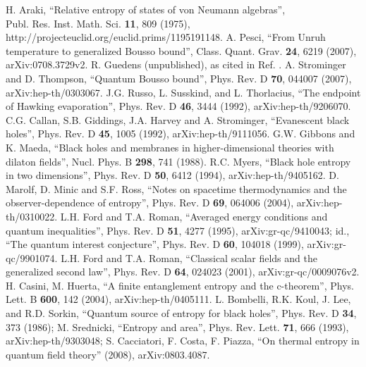 \documentclass{article}
\begin{document}
\begin{thebibliography}{99}
H. Araki, ``Relative entropy of states of von Neumann algebras'', \\Publ. Res. Inst. Math. Sci. \textbf{11}, 809 (1975), \\http://projecteuclid.org/euclid.prims/1195191148.
A. Pesci, ``From Unruh temperature to generalized Bousso bound'', Class. Quant. Grav. \textbf{24}, 6219 (2007), arXiv:0708.3729v2.
R. Guedens (unpublished), as cited in Ref. \cite{BFM03}.
A. Strominger and D. Thompson, ``Quantum Bousso bound'', Phys. Rev. D \textbf{70}, 044007 (2007), arXiv:hep-th/0303067.
J.G. Russo, L. Susskind, and L. Thorlacius, ``The endpoint of Hawking evaporation'', Phys. Rev. D \textbf{46}, 3444 (1992), arXiv:hep-th/9206070.
C.G. Callan, S.B. Giddings, J.A. Harvey and A. Strominger, ``Evanescent black holes'', Phys. Rev. D \textbf{45}, 1005 (1992), arXiv:hep-th/9111056.
G.W. Gibbons and K. Maeda, ``Black holes and membranes in higher-dimensional theories with dilaton fields'', Nucl. Phys. B \textbf{298}, 741 (1988).
R.C. Myers, ``Black hole entropy in two dimensions'', Phys. Rev. D \textbf{50}, 6412 (1994), arXiv:hep-th/9405162.
D. Marolf, D. Minic and S.F. Ross, ``Notes on spacetime thermodynamics and the observer-dependence of entropy'', Phys. Rev. D \textbf{69}, 064006 (2004), arXiv:hep-th/0310022.
L.H. Ford and T.A. Roman, ``Averaged energy conditions and quantum inequalities'', Phys. Rev. D \textbf{51}, 4277 (1995), arXiv:gr-qc/9410043; id., ``The quantum interest conjecture'', Phys. Rev. D \textbf{60}, 104018 (1999), arXiv:gr-qc/9901074.
L.H. Ford and T.A. Roman, ``Classical scalar fields and the generalized second law'', Phys. Rev. D \textbf{64}, 024023 (2001), arXiv:gr-qc/0009076v2.
H. Casini, M. Huerta, ``A finite entanglement entropy and the c-theorem'', Phys. Lett. B \textbf{600}, 142 (2004), arXiv:hep-th/0405111.
L. Bombelli, R.K. Koul, J. Lee, and R.D. Sorkin, ``Quantum source of entropy for black holes'', Phys. Rev. D \textbf{34}, 373 (1986); M. Srednicki, ``Entropy and area'', Phys. Rev. Lett. \textbf{71}, 666 (1993), arXiv:hep-th/9303048; S. Cacciatori, F. Costa, F. Piazza,  ``On thermal entropy in quantum field theory'' (2008), arXiv:0803.4087.
\end{thebibliography}
\end{document}

